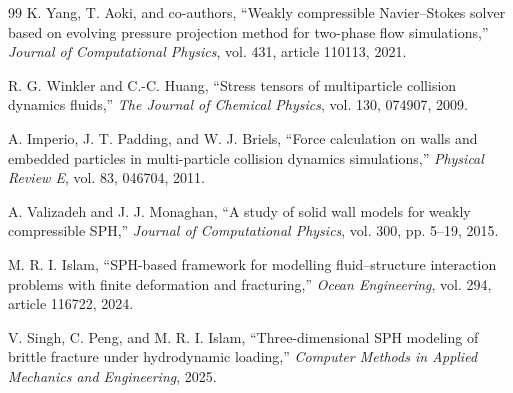 \documentclass[11pt,a4paper]{article}
\begin{document}
\begin{thebibliography}{99}
K. Yang, T. Aoki, and co-authors,
``Weakly compressible Navier--Stokes solver based on evolving pressure projection method for two-phase flow simulations,''
\emph{Journal of Computational Physics}, vol. 431, article 110113, 2021.

R. G. Winkler and C.-C. Huang,
``Stress tensors of multiparticle collision dynamics fluids,''
\emph{The Journal of Chemical Physics}, vol. 130, 074907, 2009.

A. Imperio, J. T. Padding, and W. J. Briels,
``Force calculation on walls and embedded particles in multi-particle collision dynamics simulations,''
\emph{Physical Review E}, vol. 83, 046704, 2011.

A. Valizadeh and J. J. Monaghan,
``A study of solid wall models for weakly compressible SPH,''
\emph{Journal of Computational Physics}, vol. 300, pp. 5--19, 2015.

M. R. I. Islam,
``SPH-based framework for modelling fluid--structure interaction problems with finite deformation and fracturing,''
\emph{Ocean Engineering}, vol. 294, article 116722, 2024.

V. Singh, C. Peng, and M. R. I. Islam,
``Three-dimensional SPH modeling of brittle fracture under hydrodynamic loading,''
\emph{Computer Methods in Applied Mechanics and Engineering}, 2025.

\end{thebibliography}
\end{document}
